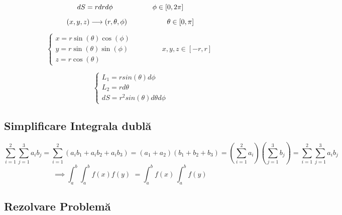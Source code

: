 \documentclass[12pt]{article}
\begin{document}
\begin{equation}
    dS=r dr d\phi \hspace{2cm} \phi \in [0,2\pi]\\
\end{equation}

\begin{equation}
 (x,y,z) \longrightarrow (r,\theta,\phi) \hspace{2cm} \theta \in [0,\pi]\\
\end{equation}

\begin{equation}
    \begin{cases}
        x = r \sin(\theta) \cos(\phi) \\
        y = r \sin(\theta) \sin(\phi) \hspace{2cm} x,y,z \in [-r,r] \\
        z = r \cos(\theta)
    \end{cases}
\end{equation}

\begin{equation}
    \begin{cases}
        L_{1} = rsin(\theta)d\phi \\
        L_{2} = rd\theta\\
        dS=r^{2}sin(\theta)d\theta d\phi
    \end{cases}
\end{equation}

\subsection{Simplificare Integrala dublă}

\begin{equation}
    \sum_{i=1}^{2}\sum_{j=1}^{3}a_{i}b_{j} = \sum_{i=1}^{2}(a_{i}b_{1}+a_{i}b_{2}+a_{i}b_{3}) = (a_{1}+a_{2})(b_{1}+b_{2}+b_{3})=(\sum_{i=1}^{2}a_{i})(\sum_{j=1}^{3}b_{j}) = \sum_{i=1}^{2}\sum_{j=1}^{3}a_{i}b_{j}
\end{equation}
\begin{equation}
    \implies \int_{a}^{b} \int_{a}^{b} f(x)f(y) \,\, = \int_{a}^{b} f(x) \, \int_{a}^{b} f(y) \,
\end{equation}

\subsection{Rezolvare Problemă}
\end{document}
